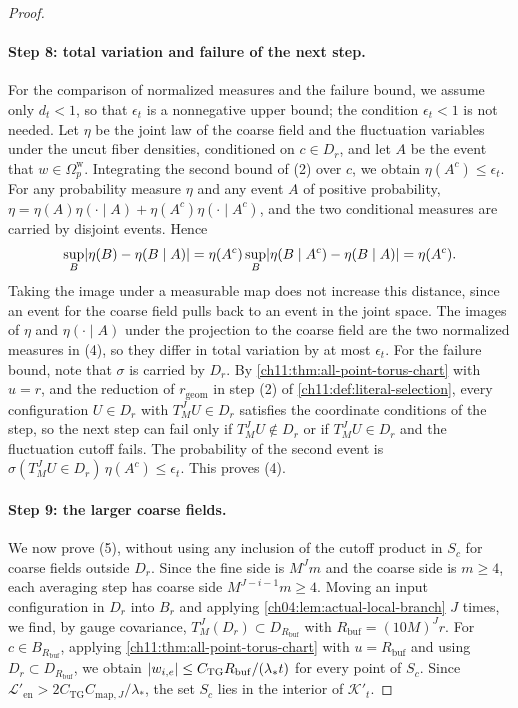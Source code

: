 \begin{proof}
\paragraph{Step 8: total variation and failure of the next step.}
For the comparison of normalized measures and the failure bound, we assume only $d_t<1$, so that $\epsilon_t$ is a nonnegative upper bound; the condition $\epsilon_t<1$ is not needed. Let $\eta$ be the joint law of the coarse field and the fluctuation variables under the uncut fiber densities, conditioned on $c\in D_r$, and let $A$ be the event that $w\in\Omega_p^{\mathrm w}$. Integrating the second bound of (2) over $c$, we obtain $\eta(A^c)\le\epsilon_t$. For any probability measure $\eta$ and any event $A$ of positive probability, $\eta=\eta(A)\eta(\cdot\mid A)+\eta(A^c)\eta(\cdot\mid A^c)$, and the two conditional measures are carried by disjoint events. Hence
\[
 \sup_B\lvert \eta(B)-\eta(B\mid A)\rvert=\eta(A^c)\sup_B\lvert \eta(B\mid A^c)-\eta(B\mid A)\rvert=\eta(A^c).
\]
Taking the image under a measurable map does not increase this distance, since an event for the coarse field pulls back to an event in the joint space. The images of $\eta$ and $\eta(\cdot\mid A)$ under the projection to the coarse field are the two normalized measures in (4), so they differ in total variation by at most $\epsilon_t$. For the failure bound, note that $\sigma$ is carried by $D_r$. By \cref{ch11:thm:all-point-torus-chart} with $u=r$, and the reduction of $r_{\mathrm{geom}}$ in step (2) of \cref{ch11:def:literal-selection}, every configuration $U\in D_r$ with $T_M^JU\in D_r$ satisfies the coordinate conditions of the step, so the next step can fail only if $T_M^JU\notin D_r$ or if $T_M^JU\in D_r$ and the fluctuation cutoff fails. The probability of the second event is $\sigma(T_M^JU\in D_r)\,\eta(A^c)\le\epsilon_t$. This proves (4).

\paragraph{Step 9: the larger coarse fields.}
We now prove (5), without using any inclusion of the cutoff product in $S_c$ for coarse fields outside $D_r$. Since the fine side is $M^Jm$ and the coarse side is $m\ge4$, each averaging step has coarse side $M^{J-i-1}m\ge4$. Moving an input configuration in $D_r$ into $B_r$ and applying \cref{ch04:lem:actual-local-branch} $J$ times, we find, by gauge covariance, $T_M^J(D_r)\subset D_{R_{\mathrm{buf}}}$ with $R_{\mathrm{buf}}=(10M)^Jr$. For $c\in B_{R_{\mathrm{buf}}}$, applying \cref{ch11:thm:all-point-torus-chart} with $u=R_{\mathrm{buf}}$ and using $D_r\subset D_{R_{\mathrm{buf}}}$, we obtain $\lvert w_{i,e}\rvert\le C_{\mathrm{TG}}R_{\mathrm{buf}}/(\lambda_*t)$ for every point of $S_c$. Since $\mathscr L'_{\mathrm{en}}>2C_{\mathrm{TG}}C_{\mathrm{map},J}/\lambda_*$, the set $S_c$ lies in the interior of $\mathcal K'_t$.


\end{proof}
